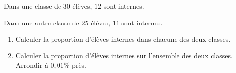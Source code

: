 \begin{exo}{}
	Dans une classe de $30$ élèves, $12$ sont internes.

	Dans une autre classe de $25$ élèves, $11$ sont internes.
	\begin{enumerate}
		\item Calculer la proportion d'élèves internes dans chacune des deux classes.
		\item Calculer la proportion d'élèves internes sur l'ensemble des deux classes. Arrondir à $0,01$\% près.
	\end{enumerate}
\end{exo}
